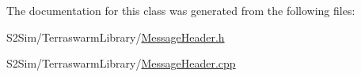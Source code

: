 The documentation for this class was generated from the following files\-:\begin{DoxyCompactItemize}
\item 
S2\-Sim/\-Terraswarm\-Library/\hyperlink{_message_header_8h}{Message\-Header.\-h}\item 
S2\-Sim/\-Terraswarm\-Library/\hyperlink{_message_header_8cpp}{Message\-Header.\-cpp}\end{DoxyCompactItemize}
